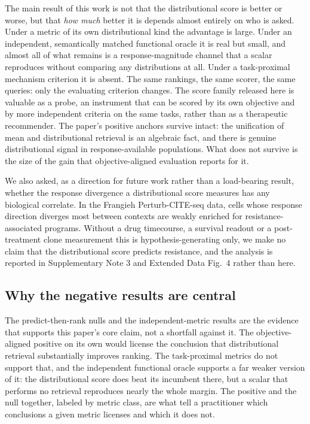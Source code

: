 \documentclass[11pt,letterpaper]{article}
\begin{document}
The main result of this work is not that the distributional score is better or worse, but that \emph{how much} better
it is depends almost entirely on who is asked. Under a metric of its own distributional kind the
advantage is large. Under an independent, semantically matched functional oracle it is real but
small, and almost all of what remains is a response-magnitude channel that a scalar reproduces
without comparing any distributions at all. Under a task-proximal mechanism criterion it is
absent. The same rankings, the same scorer, the same queries: only the evaluating criterion
changes. The score family released here is valuable as a probe, an instrument that can be
scored by its own objective and by more independent criteria on the same tasks, rather than as
a therapeutic recommender. The paper's
positive anchors survive intact: the unification of mean and distributional retrieval is an
algebraic fact, and there is genuine distributional signal in response-available populations. What
does not survive is the size of the gain that objective-aligned evaluation reports for it.

We also asked, as a direction for future work rather than a load-bearing result, whether the
response divergence a distributional score measures has any biological correlate. In the Frangieh
Perturb-CITE-seq data, cells whose response direction diverges most between contexts are weakly
enriched for resistance-associated programs. Without a drug timecourse, a survival readout or a
post-treatment clone measurement this is hypothesis-generating only, we make no claim that
the distributional score predicts resistance, and the analysis is reported in Supplementary Note 3 and Extended Data
Fig.~4 rather than here.

\subsection*{Why the negative results are central}

The predict-then-rank nulls and the independent-metric results are the evidence that supports this
paper's core claim, not a shortfall against it. The objective-aligned positive on its own would
license the conclusion that distributional retrieval substantially improves ranking. The
task-proximal metrics do not support that, and the independent functional oracle supports a far
weaker version of it: the distributional score does beat its incumbent there, but a scalar that
performs no retrieval reproduces nearly the whole margin. The positive and the null together,
labeled by metric class, are what tell a practitioner which conclusions a given metric licenses
and which it does not.
\end{document}
